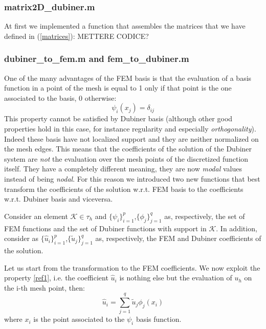 \documentclass[a4paper,12pt]{article}
\begin{document}
    \subsubsection{matrix2D\_dubiner.m}
    At first we implemented a function that assembles the matrices that we have defined in (\ref{matrices}):
    METTERE CODICE?
\subsubsection{dubiner\_to\_fem.m and fem\_to\_dubiner.m}
One of the many advantages of the FEM basis is that the evaluation of a basis function in a point of the mesh is equal to 1 only if that point is the one associated to the basis, 0 otherwise:
	\begin{equation} \label{ref1}
	\psi_i(x_j)=\delta_{ij}
	\end{equation}
	This property cannot be satisfied by Dubiner basis (although other good properties hold in this case, for instance regularity and especially \emph{orthogonality}). Indeed these basis have not localized support and they are neither normalized on the mesh edges. This means that the coefficients of the solution of the Dubiner system are \emph{not} the evaluation over the mesh points of the discretized function itself. They have a completely different meaning, they are now \emph{modal} values instead of being \emph{nodal}.
	For this reason we introduced two new functions that best transform the coefficients of the solution w.r.t. FEM basis to the coefficients w.r.t. Dubiner basis and viceversa.\vspace{5mm}
	
	\noindent Consider an element $\mathcal{K}\in \tau_h$ and $\{\psi_{i}\}_{i=1}^{p}$,$\{\phi_{j}\}_{j=1}^{q}$ as, respectively, the set of FEM functions and the set of Dubiner functions with support in $\mathcal{K}$. In addition, consider as $\{\hat{u}_i\}_{i=1}^p$,$\{\tilde{u}_j\}_{j=1}^q$ as, respectively, the FEM and Dubiner coefficients of the solution. \vspace{5mm}
	
	\noindent Let us start from the transformation to the FEM coefficients. We now exploit the property \ref{ref1}, i.e. the coefficient $\hat{u}_i$ is nothing else but the evaluation of $u_h$ on the i-th mesh point, then: 
	\begin{equation} \label{ref3}
	\hat{u}_i = \sum_{j=1}^q \tilde{u}_j\phi_j(x_i)
	\end{equation}
	where $x_i$ is the point associated to the $\psi_i$ basis function. \vspace{5mm}
	
\end{document}
